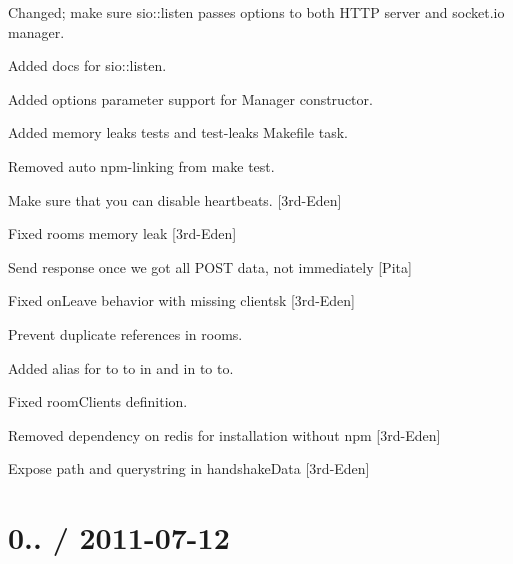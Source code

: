 \begin{DoxyItemize}
\item Changed; make sure sio\+::listen passes options to both H\+T\+TP server and socket.\+io manager.
\item Added docs for sio\+::listen.
\item Added options parameter support for Manager constructor.
\item Added memory leaks tests and test-\/leaks Makefile task.
\item Removed auto npm-\/linking from make test.
\item Make sure that you can disable heartbeats. \mbox{[}3rd-\/\+Eden\mbox{]}
\item Fixed rooms memory leak \mbox{[}3rd-\/\+Eden\mbox{]}
\item Send response once we got all P\+O\+ST data, not immediately \mbox{[}Pita\mbox{]}
\item Fixed on\+Leave behavior with missing clientsk \mbox{[}3rd-\/\+Eden\mbox{]}
\item Prevent duplicate references in rooms.
\item Added alias for {\ttfamily to} to {\ttfamily in} and {\ttfamily in} to {\ttfamily to}.
\item Fixed room\+Clients definition.
\item Removed dependency on redis for installation without npm \mbox{[}3rd-\/\+Eden\mbox{]}
\item Expose path and querystring in handshake\+Data \mbox{[}3rd-\/\+Eden\mbox{]}
\end{DoxyItemize}

\section*{0.. / 2011-\/07-\/12 }


